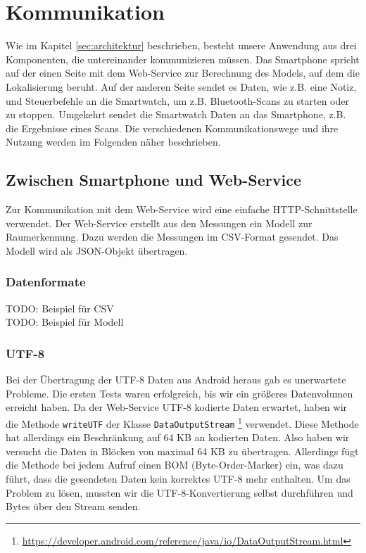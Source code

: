 \section{Kommunikation}
Wie im Kapitel \ref{sec:architektur} beschrieben, besteht unsere Anwendung aus drei Komponenten, die untereinander kommunizieren müssen. Das Smartphone spricht auf der einen Seite mit dem Web-Service zur Berechnung des Models, auf dem die Lokalisierung beruht. Auf der anderen Seite sendet es Daten, wie z.B. eine Notiz, und Steuerbefehle an die Smartwatch, um z.B. Bluetooth-Scans zu starten oder zu stoppen. Umgekehrt sendet die Smartwatch Daten an das Smartphone, z.B. die Ergebnisse eines Scans. Die verschiedenen Kommunikationswege und ihre Nutzung werden im Folgenden näher beschrieben.

\subsection{Zwischen Smartphone und Web-Service}

Zur Kommunikation mit dem Web-Service wird eine einfache HTTP-Schnittstelle verwendet.
Der Web-Service erstellt aus den Messungen ein Modell zur Raumerkennung. Dazu
werden die Messungen im CSV-Format gesendet. Das Modell wird als JSON-Objekt
übertragen.

\subsubsection{Datenformate}
TODO: Beispiel für CSV \\
TODO: Beispiel für Modell


\subsubsection{UTF-8}
Bei der Übertragung der UTF-8 Daten aus Android heraus gab es unerwartete Probleme.
Die ersten Tests waren erfolgreich, bis wir ein größeres Datenvolumen erreicht haben.
Da der Web-Service UTF-8 kodierte Daten erwartet, haben wir die Methode \texttt{writeUTF}
der Klasse \texttt{DataOutputStream}
\footnote{\url{https://developer.android.com/reference/java/io/DataOutputStream.html}} 
verwendet. Diese Methode hat allerdings ein Beschränkung auf 64 KB an kodierten Daten.
Also haben wir versucht die Daten in Blöcken von maximal 64 KB zu übertragen. Allerdings
fügt die Methode bei jedem Aufruf einen BOM (Byte-Order-Marker) ein, was dazu führt,
dass die gesendeten Daten kein korrektes UTF-8 mehr enthalten.
Um das Problem zu lösen, mussten wir die UTF-8-Konvertierung selbst durchführen
und Bytes über den Stream senden.

